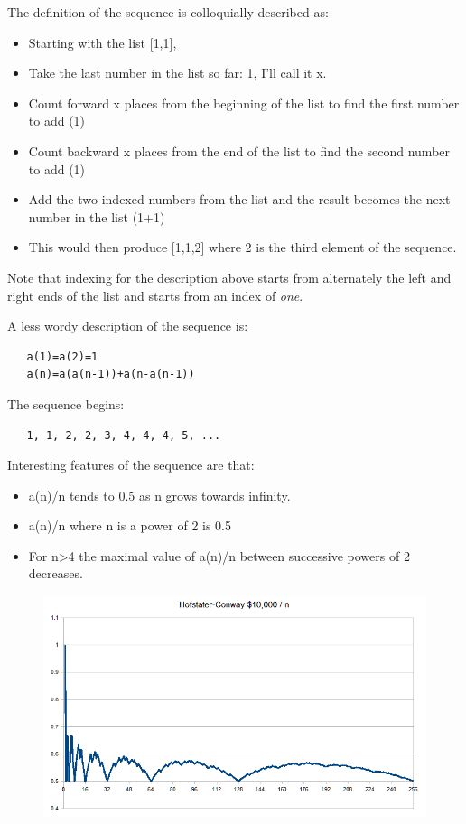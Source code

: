 \begin{itemize}
The definition of the sequence is colloquially described as:

\begin{itemize}
\item
  Starting with the list {[}1,1{]},
\item
  Take the last number in the list so far: 1, I'll call it x.
\item
  Count forward x places from the beginning of the list to find the
  first number to add (1)
\item
  Count backward x places from the end of the list to find the second
  number to add (1)
\item
  Add the two indexed numbers from the list and the result becomes the
  next number in the list (1+1)
\item
  This would then produce {[}1,1,2{]} where 2 is the third element of
  the sequence.
\end{itemize}

Note that indexing for the description above starts from alternately the
left and right ends of the list and starts from an index of \emph{one}.

A less wordy description of the sequence is:

\begin{verbatim}
   a(1)=a(2)=1
   a(n)=a(a(n-1))+a(n-a(n-1))
\end{verbatim}

The sequence begins:

\begin{verbatim}
   1, 1, 2, 2, 3, 4, 4, 4, 5, ...
\end{verbatim}

Interesting features of the sequence are that:

\begin{itemize}
\item
  a(n)/n tends to 0.5 as n grows towards infinity.
\item
  a(n)/n where n is a power of 2 is 0.5
\item
  For n\textgreater{}4 the maximal value of a(n)/n between successive
  powers of 2 decreases.
\end{itemize}

\begin{figure}[H]
  \centering
   \includegraphics[scale=.6]{graphics/Hofstadter_conway_10K.png}  
\end{figure}


\end{itemize}
